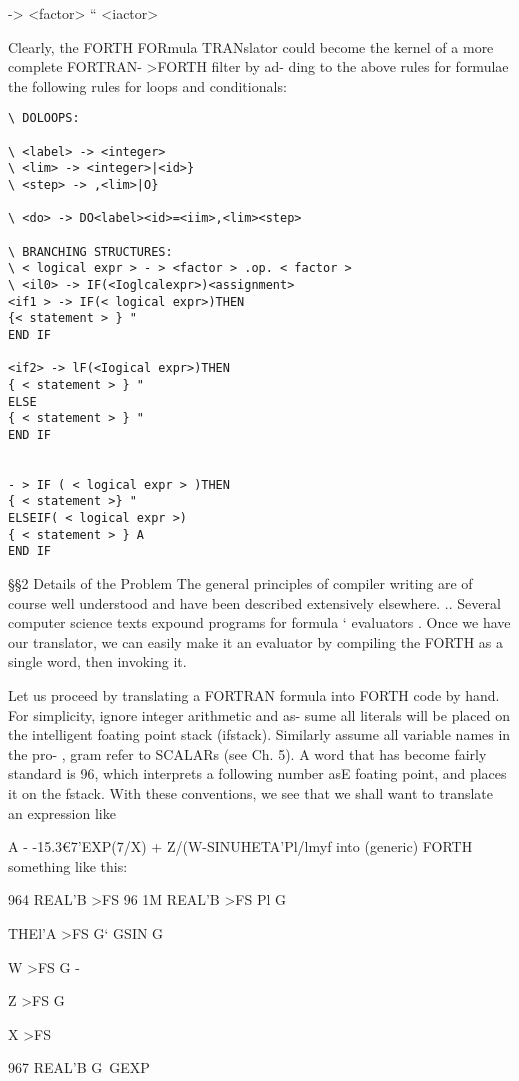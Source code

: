 -> <factor> “ <iactor>

Clearly, the FORTH FORmula TRANslator could become the
kernel of a more complete FORTRAN- >FORTH filter by ad-
ding to the above rules for formulae the following rules for loops
and conditionals:

\begin{verbatim}
\ DOLOOPS:

\ <label> -> <integer>
\ <lim> -> <integer>|<id>}
\ <step> -> ,<lim>|O}

\ <do> -> DO<label><id>=<iim>,<lim><step>

\ BRANCHING STRUCTURES:
\ < logical expr > - > <factor > .op. < factor >
\ <il0> -> IF(<Ioglcalexpr>)<assignment>
<if1 > -> IF(< logical expr>)THEN
{< statement > } "
END IF

<if2> -> lF(<Iogical expr>)THEN
{ < statement > } "
ELSE
{ < statement > } "
END IF


- > IF ( < logical expr > )THEN
{ < statement >} "
ELSEIF( < logical expr >)
{ < statement > } A
END IF

\end{verbatim}

§§2 Details of the Problem
The general principles of compiler writing are of course well
understood and have been described extensively elsewhere. ..
Several computer science texts expound programs for formula ‘
evaluators . Once we have our translator, we can easily make it
an evaluator by compiling the FORTH as a single word, then
invoking it.

 

Let us proceed by translating a FORTRAN formula into FORTH
code by hand. For simplicity, ignore integer arithmetic and as-
sume all literals will be placed on the intelligent foating point
stack (ifstack). Similarly assume all variable names in the pro- ,
gram refer to SCALARs (see Ch. 5). A word that has become
fairly standard is 96, which interprets a following number asE
foating point, and places it on the fstack. With these conventions,
we see that we shall want to translate an expression like

A - -15.3€7'EXP(7/X) + Z/(W-SINUHETA'Pl/lmyf
into (generic) FORTH something like this:

964 REAL’B >FS
96 1M REAL'B >FS
Pl G\

THEl’A >FS G‘
GSIN G

W >FS G -

Z >FS G\

X >FS

967 REAL'B G\
GEXP


